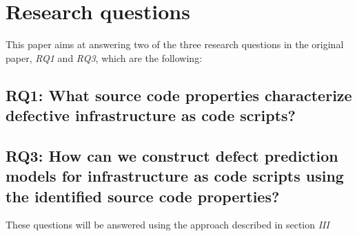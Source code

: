 
\section{Research questions}
This paper aims at answering two of the three research questions in the original paper, \textit{RQ1} and \textit{RQ3}, which are the following:
\subsection{RQ1: What source code properties characterize defective infrastructure as code scripts?}
\subsection{RQ3: How can we construct defect prediction models for
    infrastructure as code scripts using the identified source code properties?}

These questions will be answered using the approach described in section \textit{III}
